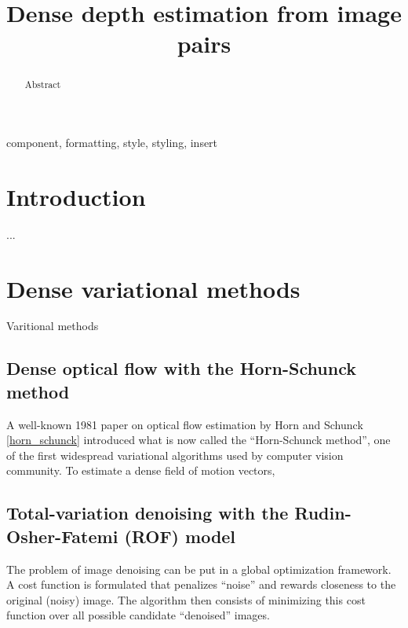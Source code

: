 \documentclass[conference]{IEEEtran}
\begin{document}
\title{Dense depth estimation from image pairs}

\author{
}

\maketitle

\begin{abstract}
Abstract
\end{abstract}

\begin{IEEEkeywords}
component, formatting, style, styling, insert
\end{IEEEkeywords}

\section{Introduction}
...

\section{Dense variational methods}
Varitional methods

\subsection{Dense optical flow with the Horn-Schunck method}
A well-known 1981 paper on optical flow estimation by Horn and Schunck \ref{horn_schunck} introduced what is now called the ``Horn-Schunck method'', one of the
first widespread variational algorithms used by computer vision community.
To estimate a dense field of motion vectors,

\subsection{Total-variation denoising with the Rudin-Osher-Fatemi (ROF) model}
The problem of image denoising can be put in a global optimization
framework. A cost function is formulated that penalizes ``noise'' and rewards closeness to the original (noisy) image. The algorithm then
consists of minimizing this cost function over all possible candidate ``denoised'' images.
\end{document}
